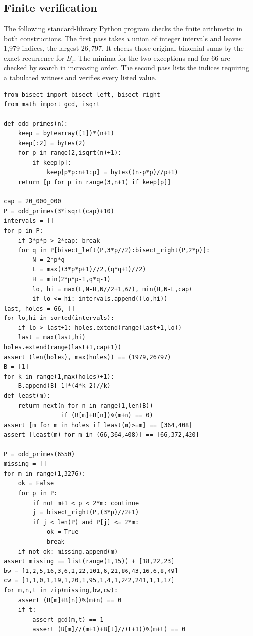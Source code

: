 \documentclass[11pt,a4paper]{article}
\numberwithin{equation}{section}
\begin{document}
\subsection{Finite verification}

The following standard-library Python program checks the finite
arithmetic in both constructions. The first pass takes a union of
integer intervals and leaves 1,979 indices, the largest $26{,}797$.
It checks those original binomial sums by the exact recurrence for
$B_j$. The minima for the two exceptions and for $66$ are checked by
search in increasing order. The second pass lists the indices
requiring a tabulated witness and verifies every listed value.
\begingroup\small
\begin{lstlisting}
from bisect import bisect_left, bisect_right
from math import gcd, isqrt

def odd_primes(n):
    keep = bytearray([1])*(n+1)
    keep[:2] = bytes(2)
    for p in range(2,isqrt(n)+1):
        if keep[p]:
            keep[p*p:n+1:p] = bytes((n-p*p)//p+1)
    return [p for p in range(3,n+1) if keep[p]]

cap = 20_000_000
P = odd_primes(3*isqrt(cap)+10)
intervals = []
for p in P:
    if 3*p*p > 2*cap: break
    for q in P[bisect_left(P,3*p//2):bisect_right(P,2*p)]:
        N = 2*p*q
        L = max((3*p*p+1)//2,(q*q+1)//2)
        H = min(2*p*p-1,q*q-1)
        lo, hi = max(L,N-H,N//2+1,67), min(H,N-L,cap)
        if lo <= hi: intervals.append((lo,hi))
last, holes = 66, []
for lo,hi in sorted(intervals):
    if lo > last+1: holes.extend(range(last+1,lo))
    last = max(last,hi)
holes.extend(range(last+1,cap+1))
assert (len(holes), max(holes)) == (1979,26797)
B = [1]
for k in range(1,max(holes)+1):
    B.append(B[-1]*(4*k-2)//k)
def least(m):
    return next(n for n in range(1,len(B))
                if (B[m]+B[n])%(m+n) == 0)
assert [m for m in holes if least(m)>=m] == [364,408]
assert [least(m) for m in (66,364,408)] == [66,372,420]

P = odd_primes(6550)
missing = []
for m in range(1,3276):
    ok = False
    for p in P:
        if not m+1 < p < 2*m: continue
        j = bisect_right(P,(3*p)//2+1)
        if j < len(P) and P[j] <= 2*m:
            ok = True
            break
    if not ok: missing.append(m)
assert missing == list(range(1,15)) + [18,22,23]
bw = [1,2,5,16,3,6,2,22,101,6,21,86,43,16,6,8,49]
cw = [1,1,0,1,19,1,20,1,95,1,4,1,242,241,1,1,17]
for m,n,t in zip(missing,bw,cw):
    assert (B[m]+B[n])%(m+n) == 0
    if t:
        assert gcd(m,t) == 1
        assert (B[m]//(m+1)+B[t]//(t+1))%(m+t) == 0
\end{lstlisting}
\endgroup
\end{document}
